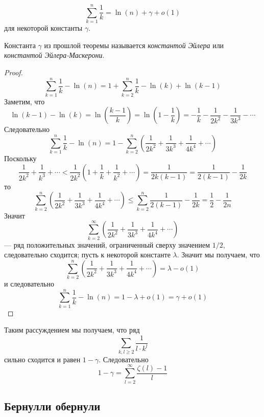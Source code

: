 \documentclass[12pt,a4paper]{article}
\begin{document}
    \begin{theorem}
        \[\sum_{k=1}^n \frac{1}{k} = \ln(n) + \gamma + o(1)\]
        для некоторой константы $\gamma$.
    \end{theorem}

    \begin{definition}
        Константа $\gamma$ из прошлой теоремы называется \emph{константой Эйлера} или \emph{константой Эйлера-Маскерони}.
    \end{definition}

    \begin{proof}
        \[\sum_{k=1}^n \frac{1}{k} - \ln(n) = 1 + \sum_{k=2}^n \frac{1}{k} - \ln(k) + \ln(k-1)\]
        Заметим, что
        \[\ln(k-1) - \ln(k) = \ln\left(\frac{k-1}{k}\right) = \ln\left(1-\frac{1}{k}\right) = -\frac{1}{k} - \frac{1}{2k^2} - \frac{1}{3k^3} - \cdots\]
        Следовательно
        \[\sum_{k=1}^n \frac{1}{k} - \ln(n) = 1 - \sum_{k=2}^n \left(\frac{1}{2k^2} + \frac{1}{3k^3} + \frac{1}{4k^4} + \cdots\right)\]
        Поскольку
        \[\frac{1}{2k^2} + \frac{1}{k^3} + \cdots < \frac{1}{2k^2} \left(1 + \frac{1}{k} + \frac{1}{k^2} + \cdots\right) = \frac{1}{2k(k-1)} = \frac{1}{2(k-1)} - \frac{1}{2k}\]
        то
        \[\sum_{k=2}^n \left(\frac{1}{2k^2} + \frac{1}{3k^3} + \frac{1}{4k^4} + \cdots\right) \leqslant \sum_{k=2}^n \frac{1}{2(k-1)} - \frac{1}{2k} = \frac{1}{2} - \frac{1}{2n}\]
        Значит
        \[\sum_{k=2}^\infty \left(\frac{1}{2k^2} + \frac{1}{3k^3} + \frac{1}{4k^4} + \cdots\right)\]
        --- ряд положительных значений, ограниченный сверху значением $1/2$, следовательно сходится; пусть к некоторой константе $\lambda$. Значит мы получаем, что
        \[\sum_{k=2}^n \left(\frac{1}{2k^2} + \frac{1}{3k^3} + \frac{1}{4k^4} + \cdots\right) = \lambda - o(1)\]
        и следовательно
        \[\sum_{k=1}^n \frac{1}{k} - \ln(n) = 1 - \lambda + o(1) = \gamma + o(1)\]
    \end{proof}

    \begin{remark}
        Таким рассуждением мы получаем, что ряд
        \[\sum_{k, l \geqslant 2} \frac{1}{l \cdot k^l}\]
        сильно сходится и равен $1 - \gamma$. Следовательно
        \[1 - \gamma = \sum_{l=2}^\infty \frac{\zeta(l) - 1}{l}\]
    \end{remark}

    \subsection{Бернулли обернули}
\end{document}
